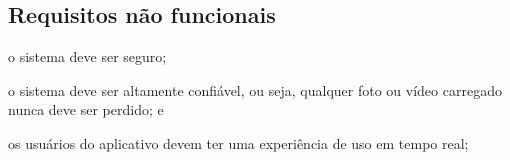 \subsection{Requisitos não funcionais}

\begin{alineas}
	\item o sistema deve ser seguro;
	\item o sistema deve ser altamente confiável, ou seja, qualquer foto ou vídeo carregado nunca deve ser perdido; e
	\item os usuários do aplicativo devem ter uma experiência de uso em tempo real;
\end{alineas}
